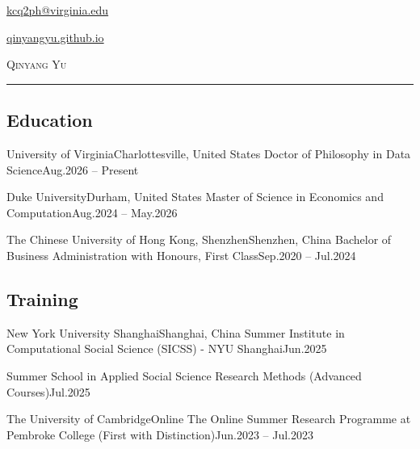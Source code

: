 \documentclass[a4paper, 10pt]{article}
\begin{document}
\begin{flushright}
  \item {\Calluna \href{mailto:kcq2ph@virginia.edu}{kcq2ph@virginia.edu}}  %
  \item {\Calluna \href{https://qinyangyu.github.io/}{qinyangyu.github.io}}  %
\end{flushright}\vspace{-45pt}

\begin{flushleft}
  {\Calluna \fontsize{30pt}{30pt}\selectfont \textsc{Qinyang Yu}}
  \noindent\rule{\textwidth}{0.4pt}
\end{flushleft}

\begin{longSection}{\section{Education}}
\eduHeading
  {University of Virginia}{Charlottesville, United States}
  {Doctor of Philosophy in Data Science}{Aug.2026 – Present}
\itemListStart
\itemListEnd

\eduHeading
  {Duke University}{Durham, United States}
  {Master of Science in Economics and Computation}{Aug.2024 – May.2026}
\itemListStart
\itemListEnd

\eduHeading
  {The Chinese University of Hong Kong, Shenzhen}{Shenzhen, China}
  {Bachelor of Business Administration with Honours, First Class}{Sep.2020 – Jul.2024}
\itemListStart
\itemListEnd
\end{longSection}

\begin{longSection}{\section{Training}}
\eduHeading
  {New York University Shanghai}{Shanghai, China}
  {Summer Institute in Computational Social Science (SICSS) - NYU Shanghai}{Jun.2025}

\eduLine
  {Summer School in Applied Social Science Research Methods (Advanced Courses)}{Jul.2025}

\eduHeading
  {The University of Cambridge}{Online}
  {The Online Summer Research Programme at Pembroke College (First with Distinction)}{Jun.2023 – Jul.2023}
\end{longSection}
\end{document}
